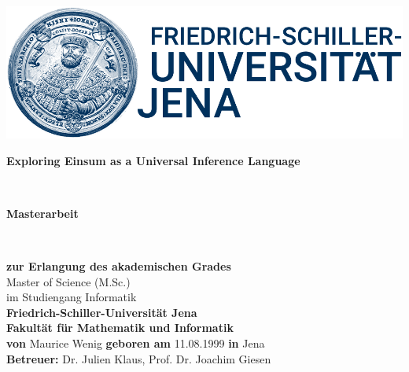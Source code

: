 \documentclass[twoside, fontsize=12pt, parskip=half-]{scrbook}
\theoremstyle{mythm}
\theoremstyle{definition}
\begin{document}
\frontmatter
\thispagestyle{empty}
\begin{titlepage}
	\centering
	\vspace*{3cm}
	\includegraphics{hanfried_logo.png}
	\vspace{2cm}\\
	\begin{LARGE}
		\textbf{Exploring Einsum as a Universal Inference Language}
	\end{LARGE}
	\vspace{2cm}\\
	\begin{Large}
		\textbf{Masterarbeit}
	\end{Large}\vspace{3mm}\\
	\begin{large}
		\begin{spacing}{1.6}
			\textbf{zur Erlangung des akademischen Grades}\\
			Master of Science (M.Sc.)\\
			im Studiengang Informatik\vspace{3mm}\\
			\textbf{Friedrich-Schiller-Universität Jena\\
				Fakultät für Mathematik und Informatik}\vspace{3mm}\\
			\textbf{von} Maurice Wenig \textbf{geboren am} 11.08.1999 \textbf{in} Jena\\
			\textbf{Betreuer:} Dr. Julien Klaus, Prof. Dr. Joachim Giesen
		\end{spacing}
	\end{large}
\end{titlepage}
\cleardoublepage


\setcounter{tocdepth}{1}
\tableofcontents


\mainmatter
\fancyhead[LO,RE]{\itshape\nouppercase\leftmark}







\typeout{}


\backmatter

\listoffigures
\listoftables
\appendix

\end{document}
